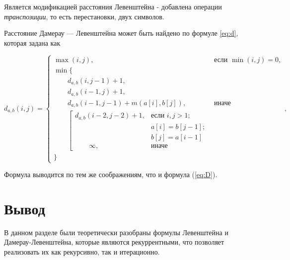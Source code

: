 Является модификацией расстояния Левенштейна - добавлена операции \textit{транспозиции}, то есть перестановки, двух символов.

Расстояние Дамерау — Левенштейна может быть найдено по формуле \ref{eq:d}, которая задана как


\begin{equation}
	\label{eq:d}
	d_{a,b}(i, j) = \begin{cases}
		\max(i, j), &\text{если }\min(i, j) = 0,\\
		\min \lbrace \\
			\qquad d_{a,b}(i, j-1) + 1,\\
			\qquad d_{a,b}(i-1, j) + 1,\\
			\qquad d_{a,b}(i-1, j-1) + m(a[i], b[j]), &\text{иначе}\\
			\qquad \left[ \begin{array}{cc}d_{a,b}(i-2, j-2) + 1, &\text{если }i,j > 1;\\
			\qquad &\text{}a[i] = b[j-1]; \\
			\qquad &\text{}b[j] = a[i-1]\\
			\qquad \infty, & \text{иначе}\end{array}\right.\\
		\rbrace
		\end{cases},
\end{equation}

Формула выводится по тем же соображениям, что и формула (\ref{eq:D}).


\section*{Вывод}
В данном разделе были теоретически разобраны формулы Левенштейна и Дамерау-Левенштейна, которые являются рекуррентными, что позволяет реализовать их как рекурсивно, так и итерационно.
